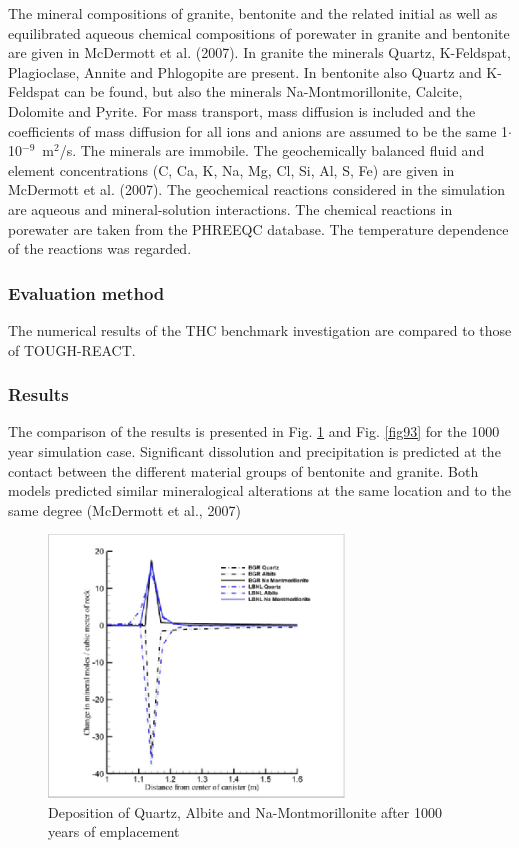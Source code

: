 The mineral compositions of granite, bentonite and the related initial as well as equilibrated aqueous chemical compositions of porewater in granite and bentonite are given in McDermott et al. (2007). In granite the minerals Quartz, K-Feldspat, Plagioclase, Annite and Phlogopite are present. In bentonite also Quartz and K-Feldspat can be found, but also the minerals Na-Montmorillonite, Calcite, Dolomite and Pyrite. For mass transport, mass diffusion is included and the coefficients of mass diffusion for all ions and anions are assumed to be the same 1$\cdot$10$^{-9}$~m$^2$/s. The minerals are immobile. The geochemically balanced fluid and element concentrations (C, Ca, K, Na, Mg, Cl, Si, Al, S, Fe) are given in McDermott et al. (2007). The geochemical reactions considered in the simulation are aqueous and mineral-solution interactions. The chemical reactions in porewater are taken from the PHREEQC database. The temperature dependence of the reactions was regarded.


\subsubsection{Evaluation method}

The numerical results of the THC benchmark investigation are compared to those of TOUGH-REACT.

\subsubsection{Results}

The comparison of the results is presented in Fig. \ref{fig92} and Fig. \ref{fig93} for the 1000 year simulation case. Significant dissolution and precipitation is predicted at the contact between the different material groups of bentonite and granite. Both models predicted similar mineralogical alterations at the same location and to the same degree (McDermott et al., 2007)

\begin{figure}[htbp]
\centering
\includegraphics[width=0.7\textwidth]{THC/figures/fig92.eps}
\caption{Deposition of Quartz, Albite and Na-Montmorillonite after 1000 years of emplacement}
\label{fig92}
\end{figure}

